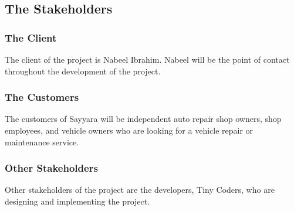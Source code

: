 \documentclass[12pt]{article}
\begin{document}
\subsection{The Stakeholders}

\subsubsection{The Client}
The client of the project is Nabeel Ibrahim. Nabeel will be the point of contact throughout the
development of the project.

\subsubsection{The Customers}
The customers of Sayyara will be independent auto repair shop owners, shop employees, and vehicle
owners who are looking for a vehicle repair or maintenance service.

\subsubsection{Other Stakeholders}
Other stakeholders of the project are the developers, Tiny Coders, who are designing and
implementing the project.
\end{document}

